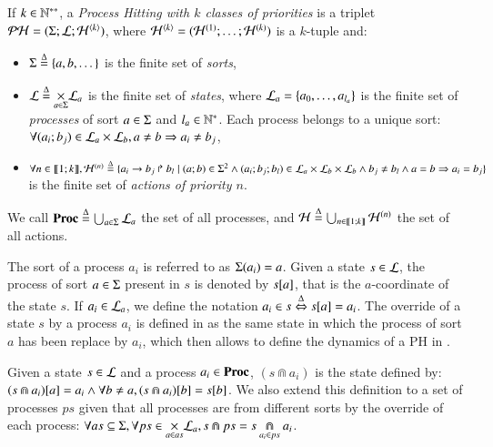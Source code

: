 \begin{definition}
\label{def:ph}
  If $k \in \mathbb{N}^{**}$, a \emph{Process Hitting with $k$ classes of priorities} is a triplet $\mathcal{PH} = (\Sigma; \mathcal{L}; \mathcal{H}^{\langle k \rangle})$,
  where $\mathcal{H}^{\langle k \rangle} = (\mathcal{H}^{(1)}; \dots; \mathcal{H}^{(k)})$ is a $k$-tuple and:
  \begin{itemize}
    \item $\Sigma \stackrel{\Delta}= \{a, b, \dots\}$ is the finite set of \emph{sorts},
    \item $\mathcal{L} \stackrel{\Delta}= \underset{a \in \Sigma}{\times} \mathcal{L}_a$ is the finite set of \emph{states}, where $\mathcal{L}_a = \{a_0, \ldots, a_{l_a}\}$ is the finite set of \emph{processes} of sort $a \in \Sigma$ and $l_a \in \mathbb{N}^*$. Each process belongs to a unique sort: $\forall (a_i; b_j) \in \mathcal{L}_a \times \mathcal{L}_b, a \neq b \Rightarrow a_i \neq b_j$,
    \item $\forall n \in \llbracket 1; k \rrbracket, \mathcal{H}^{(n)} \stackrel{\Delta}= \{a_i\rightarrow b_j\Rsh b_l \mid (a; b) \in \Sigma^2 \wedge (a_i; b_j; b_l) \in \mathcal{L}_a \times \mathcal{L}_b \times \mathcal{L}_b \wedge b_j \neq b_l \wedge a = b \Rightarrow a_i = b_j \}$ is the finite set of \emph{actions of priority $n$}.
  \end{itemize}
  We call $\mathbf{Proc} \stackrel{\Delta}= \bigcup_{a \in \Sigma} \mathcal{L}_a$ the set of all processes, and $\mathcal{H} \stackrel{\Delta}= \bigcup_{n \in \llbracket 1; k \rrbracket} \mathcal{H}^{(n)}$ the set of all actions.
\end{definition}
\noindent
The sort of a process $a_i$ is referred to as $\Sigma(a_i) = a$.
Given a state $s\in \mathcal{L}$, the process of sort $a \in \Sigma$ present in $s$ is denoted by ${s[a]}$, that is the $a$-coordinate of the state $s$.
If $a_i \in \mathcal{L}_a$, we define the notation $a_i \in s \stackrel{\Delta}\Leftrightarrow {s[a]} = a_i$.
The override of a state $s$ by a process $a_i$ is defined in  as the same state in which the process of sort $a$ has been replace by $a_i$,
which then allows to define the dynamics of a PH in .
\begin{definition}[$\Cap : \PHl \times \PHproc \rightarrow \PHl$]
\label{def:statecap}
  Given a state $s \in \mathcal{L}$ and a process $a_i \in \mathbf{Proc}$, $(s \Cap a_i)$ is the state defined by:
  ${(s \Cap a_i)[a]} = a_i \wedge \forall b \neq a, {(s \Cap a_i)[b]} = {s[b]}$.
  We also extend this definition to a set of processes $ps$ given that all processes are from different sorts by the override of each process:
  $\forall as \subseteq \Sigma, \forall ps \in \underset{a \in as}{\times} \mathcal{L}_a, s \Cap ps = s \underset{a_i \in ps}{\Cap} a_i$.
\end{definition}
